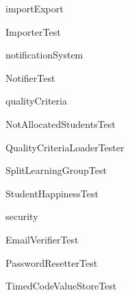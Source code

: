 \documentclass[parskip=full]{scrartcl}
\begin{document}
\begin{itemPackage}
	\item importExport
	\begin{itemClass}
		\item ImporterTest
	\end{itemClass}
\end{itemPackage}
\begin{itemPackage}
	\item notificationSystem
	\begin{itemClass}
		\item NotifierTest
	\end{itemClass}
\end{itemPackage}
\begin{itemPackage}
	\item qualityCriteria
	\begin{itemClass}
		\item NotAllocatedStudentsTest
	\end{itemClass}
	\begin{itemClass}
		\item QualityCriteriaLoaderTester
	\end{itemClass}
	\begin{itemClass}
		\item SplitLearningGroupTest
	\end{itemClass}
	\begin{itemClass}
		\item StudentHappinessTest
	\end{itemClass}
\end{itemPackage}
\begin{itemPackage}
	\item security
	\begin{itemClass}
		\item EmailVerifierTest
	\end{itemClass}
	\begin{itemClass}
		\item PasswordResetterTest
	\end{itemClass}
	\begin{itemClass}
		\item TimedCodeValueStoreTest
	\end{itemClass}
\end{itemPackage}



\end{document}
